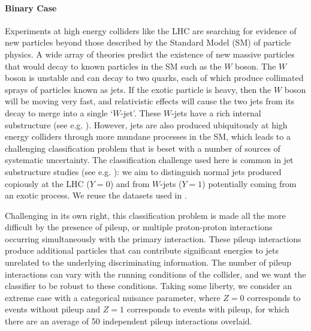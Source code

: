\documentclass{article}
\theoremstyle{plain}
\begin{document}
\paragraph{Binary Case} Experiments at high energy colliders like the LHC \citep{LHCMachine} are
searching for evidence of new particles beyond those described by the
Standard Model (SM) of particle physics. A wide array of
theories predict the existence of new massive particles that would decay to
known particles in the SM such as the $W$ boson. The $W$ boson is unstable and
can decay to two quarks, each of which produce collimated sprays of particles
known as jets.
If the exotic particle
is heavy, then the $W$ boson will be moving very fast, and  relativistic effects
will cause the two jets from its decay to merge into a single `$W$-jet'. These
$W$-jets have a rich internal substructure (see e.g.
\citep{Altheimer:2012mn,Altheimer:2013yza}). However,
jets are also produced ubiquitously at high energy colliders through more
mundane processes in the SM, which leads to a challenging classification problem
that is beset with a number of sources of systematic uncertainty.
The classification challenge used here is common in jet substructure
studies (see e.g. \citep{Khachatryan:2014vla,ATL-PHYS-PUB-2015-033,wbosonATLAS}): we aim to distinguish normal jets produced copiously
at the LHC ($Y=0$) and from $W$-jets ($Y=1$) potentially coming from an exotic process.
We reuse the datasets used in
\citep{baldi2016jet}.

Challenging in its own right, this classification
problem is made all the more difficult by the presence of pileup, or multiple
 proton-proton interactions occurring simultaneously with the primary
interaction.  These pileup interactions produce additional particles that can
contribute significant energies to jets unrelated to the underlying
discriminating information. The number of pileup interactions can vary with
the running conditions of the collider, and we want the classifier to be robust
to these conditions. Taking some liberty, we consider an extreme case with
a categorical nuisance parameter, where $Z=0$ corresponds to events without pileup
and $Z=1$ corresponds to events with pileup, for which there are an average  of
50 independent pileup interactions overlaid.
\end{document}
